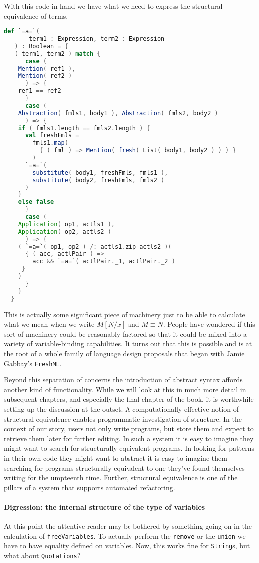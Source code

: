 With this code in hand we have what we need to express the structural
equivalence of terms.

\begin{lstlisting}[language=Scala]  
  def `=a=`(
       term1 : Expression, term2 : Expression
   ) : Boolean = {
   ( term1, term2 ) match {
      case (
	Mention( ref1 ),
	Mention( ref2 )
      ) => {
	ref1 == ref2
      }
      case (
	Abstraction( fmls1, body1 ), Abstraction( fmls2, body2 )
      ) => {
	if ( fmls1.length == fmls2.length ) {
	  val freshFmls =
	    fmls1.map(
	      { ( fml ) => Mention( fresh( List( body1, body2 ) ) ) }
	    )
	  `=a=`(
	    substitute( body1, freshFmls, fmls1 ),
	    substitute( body2, freshFmls, fmls2 )
	  )
	}
	else false
      }      
      case (
	Application( op1, actls1 ),
	Application( op2, actls2 )
      ) => {
	( `=a=`( op1, op2 ) /: actls1.zip actls2 )(
	  { ( acc, actlPair ) =>
	    acc && `=a=`( actlPair._1, actlPair._2 )
	 }
	)
      }
    }
  }
\end{lstlisting}

This is actually some significant piece of machinery just to be able
to calculate what we mean when we write $M[N/x]$ and $M \equiv N$.
People have wondered if this sort of machinery could be reasonably
factored so that it could be mixed into a variety of variable-binding
capabilities. It turns out that this is possible and is at the root of
a whole family of language design proposals that began with Jamie
Gabbay's \texttt{FreshML}.

Beyond this separation of concerns the introduction of abstract syntax
affords another kind of functionality. While we will look at this in
much more detail in subsequent chapters, and especially the final
chapter of the book, it is worthwhile setting up the discussion at the
outset. A computationally effective notion of structural equivalence
enables programmatic investigation of structure. In the context of our
story, users not only write programs, but store them and expect to
retrieve them later for further editing. In such a system it is easy
to imagine they might want to search for structurally equivalent
programs. In looking for patterns in their own code they might want to
abstract it is easy to imagine them searching for programs
structurally equivalent to one they've found themselves writing for
the umpteenth time. Further, structural equivalence is one of the
pillars of a system that supports automated refactoring.

\paragraph{Digression: the internal structure of the type of variables}
At this point the attentive reader may be bothered by something going
on in the calculation of \lstinline[language=Scala]!freeVariables!. To
actually perform the \lstinline[language=Scala]!remove! or the
\lstinline[language=Scala]!union! we have to have equality defined on
variables. Now, this works fine for
\lstinline[language=Scala]!String!s, but what about
\lstinline[language=Scala]!Quotations!?

